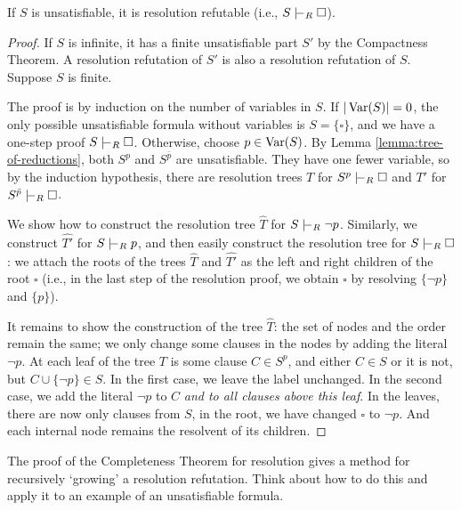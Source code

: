 \begin{theorem}
If $S$ is unsatisfiable, it is resolution refutable (i.e., $S \proves_R \square$).
\end{theorem}   
\begin{proof}
If $S$ is infinite, it has a finite unsatisfiable part $S'$ by the Compactness Theorem. A resolution refutation of $S'$ is also a resolution refutation of $S$. Suppose $S$ is finite.

The proof is by induction on the number of variables in $S$. If $|\operatorname{Var}(S)| = 0$, the only possible unsatisfiable formula without variables is $S = \{\square\}$, and we have a one-step proof $S \proves_R \square$. Otherwise, choose $p \in \operatorname{Var}(S)$. By Lemma \ref{lemma:tree-of-reductions}, both $S^p$ and $S^{\bar{p}}$ are unsatisfiable. They have one fewer variable, so by the induction hypothesis, there are resolution trees $T$ for $S^p \proves_R \square$ and $T'$ for $S^{\bar{p}} \proves_R \square$.

We show how to construct the resolution tree $\widehat{T}$ for $S \proves_R \neg p$. Similarly, we construct $\widehat{T'}$ for $S \proves_R p$, and then easily construct the resolution tree for $S \proves_R \square$: we attach the roots of the trees $\widehat{T}$ and $\widehat{T'}$ as the left and right children of the root $\square$ (i.e., in the last step of the resolution proof, we obtain $\square$ by resolving $\{\neg p\}$ and $\{p\}$).

It remains to show the construction of the tree $\widehat{T}$: the set of nodes and the order remain the same; we only change some clauses in the nodes by adding the literal $\neg p$. At each leaf of the tree $T$ is some clause $C \in S^p$, and either $C \in S$ or it is not, but $C \cup \{\neg p\} \in S$. In the first case, we leave the label unchanged. In the second case, we add the literal $\neg p$ to $C$ \emph{and to all clauses above this leaf}. In the leaves, there are now only clauses from $S$, in the root, we have changed $\square$ to $\neg p$. And each internal node remains the resolvent of its children.
\end{proof}

\begin{exercise}
    The proof of the Completeness Theorem for resolution gives a method for recursively `growing' a resolution refutation. Think about how to do this and apply it to an example of an unsatisfiable formula.
\end{exercise} %


